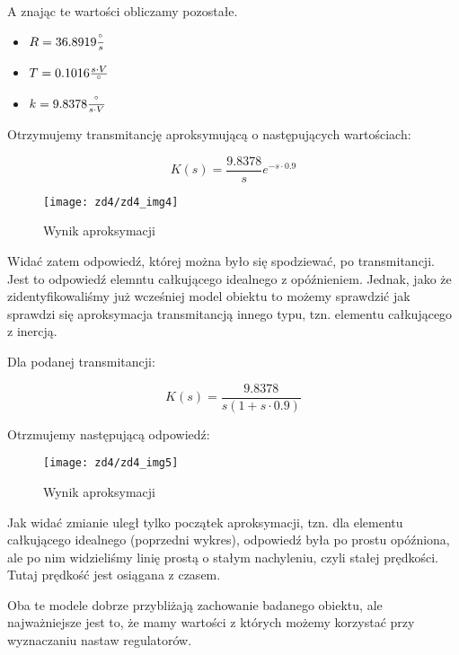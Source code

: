 \documentclass[11 pt]{article}
\begin{document}
A znając te wartości obliczamy pozostałe.

\begin{itemize}
\item[] $R = 36.8919 \frac{\degree}{s}$
\item[] $T = 0.1016 \frac{s \cdot V}{\degree}$
\item[] $k = 9.8378 \frac{\degree}{s \cdot V}$
\end{itemize}

Otrzymujemy transmitancję aproksymującą o następujących wartościach:

\begin{equation*}
K(s) = \frac{9.8378}{s} e^{-s \cdot 0.9}
\end{equation*}

\begin{figure}[h!]
	\centerline{
	\texttt{[image: zd4/zd4\_img4]}
	}
	\caption{Wynik aproksymacji}
\end{figure}

Widać zatem odpowiedź, której można było się spodziewać, po transmitancji. Jest to odpowiedź elemntu całkującego idealnego z opóźnieniem. Jednak, jako że zidentyfikowaliśmy już wcześniej model obiektu to możemy sprawdzić jak sprawdzi się aproksymacja transmitancją innego typu, tzn. elementu całkującego z inercją.

\newpage

Dla podanej transmitancji:

\begin{equation*}
K(s) = \frac{9.8378}{s(1 + s \cdot 0.9)}
\end{equation*}

Otrzmujemy następującą odpowiedź:

\begin{figure}[h!]
	\centerline{
	\texttt{[image: zd4/zd4\_img5]}
	}
	\caption{Wynik aproksymacji}
\end{figure}

Jak widać zmianie uległ tylko początek aproksymacji, tzn. dla elementu całkującego idealnego (poprzedni wykres), odpowiedź była po prostu opóźniona, ale po nim widzieliśmy linię prostą o stałym nachyleniu, czyli stałej prędkości. Tutaj prędkość jest osiągana z czasem.

Oba te modele dobrze przybliżają zachowanie badanego obiektu, ale najważniejsze jest to, że mamy wartości z których możemy korzystać przy wyznaczaniu nastaw regulatorów.

\newpage
\end{document}
